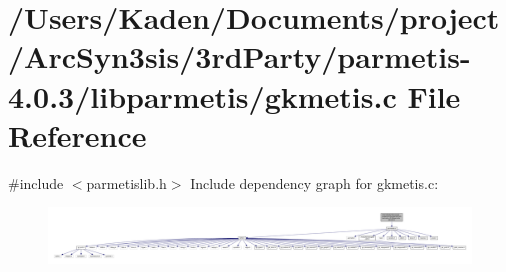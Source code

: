 \hypertarget{a00356}{}\section{/\+Users/\+Kaden/\+Documents/project/\+Arc\+Syn3sis/3rd\+Party/parmetis-\/4.0.3/libparmetis/gkmetis.c File Reference}
\label{a00356}
{\ttfamily \#include $<$parmetislib.\+h$>$}\newline
Include dependency graph for gkmetis.\+c\+:\nopagebreak
\begin{figure}[H]
\begin{center}
\leavevmode
\includegraphics[width=350pt]{a00357}
\end{center}
\end{figure}

